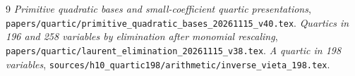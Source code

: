 \documentclass[11pt,a4paper]{article}
\begin{document}
\begin{thebibliography}{9}
\emph{Primitive quadratic bases and small-coefficient quartic presentations},
\nolinkurl{papers/quartic/primitive_quadratic_bases_20261115_v40.tex}.
\emph{Quartics in 196 and 258 variables by elimination after monomial
rescaling},
\nolinkurl{papers/quartic/laurent_elimination_20261115_v38.tex}.
\emph{A quartic in 198 variables},
\nolinkurl{sources/h10_quartic198/arithmetic/inverse_vieta_198.tex}.
\end{thebibliography}
\end{document}

